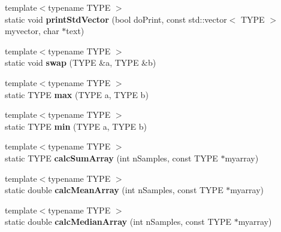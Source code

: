 \begin{DoxyCompactItemize}
\item 
\hypertarget{class_k_w_util_ac17252f672282e2f60e76d594ed2d8f7}{{\footnotesize template$<$typename T\-Y\-P\-E $>$ }\\static void {\bfseries print\-Std\-Vector} (bool do\-Print, const std\-::vector$<$ T\-Y\-P\-E $>$ myvector, char $\ast$text)}\label{class_k_w_util_ac17252f672282e2f60e76d594ed2d8f7}

\item 
\hypertarget{class_k_w_util_a6ed5d213169247c4b3fe3ed2fb96dd88}{{\footnotesize template$<$typename T\-Y\-P\-E $>$ }\\static void {\bfseries swap} (T\-Y\-P\-E \&a, T\-Y\-P\-E \&b)}\label{class_k_w_util_a6ed5d213169247c4b3fe3ed2fb96dd88}

\item 
\hypertarget{class_k_w_util_a707d699ad01c87ba21e06fe28de85712}{{\footnotesize template$<$typename T\-Y\-P\-E $>$ }\\static T\-Y\-P\-E {\bfseries max} (T\-Y\-P\-E a, T\-Y\-P\-E b)}\label{class_k_w_util_a707d699ad01c87ba21e06fe28de85712}

\item 
\hypertarget{class_k_w_util_af1b3640361810ba75435a850d73a2413}{{\footnotesize template$<$typename T\-Y\-P\-E $>$ }\\static T\-Y\-P\-E {\bfseries min} (T\-Y\-P\-E a, T\-Y\-P\-E b)}\label{class_k_w_util_af1b3640361810ba75435a850d73a2413}

\item 
\hypertarget{class_k_w_util_abe27306f912197863466e7c68d3c66fb}{{\footnotesize template$<$typename T\-Y\-P\-E $>$ }\\static T\-Y\-P\-E {\bfseries calc\-Sum\-Array} (int n\-Samples, const T\-Y\-P\-E $\ast$myarray)}\label{class_k_w_util_abe27306f912197863466e7c68d3c66fb}

\item 
\hypertarget{class_k_w_util_ad9cb19db7d541d5ca5a60c6a28b922e1}{{\footnotesize template$<$typename T\-Y\-P\-E $>$ }\\static double {\bfseries calc\-Mean\-Array} (int n\-Samples, const T\-Y\-P\-E $\ast$myarray)}\label{class_k_w_util_ad9cb19db7d541d5ca5a60c6a28b922e1}

\item 
\hypertarget{class_k_w_util_a6c10285ae2d87ccda6ddaa18c81dea39}{{\footnotesize template$<$typename T\-Y\-P\-E $>$ }\\static double {\bfseries calc\-Median\-Array} (int n\-Samples, const T\-Y\-P\-E $\ast$myarray)}\label{class_k_w_util_a6c10285ae2d87ccda6ddaa18c81dea39}


\end{DoxyCompactItemize}
